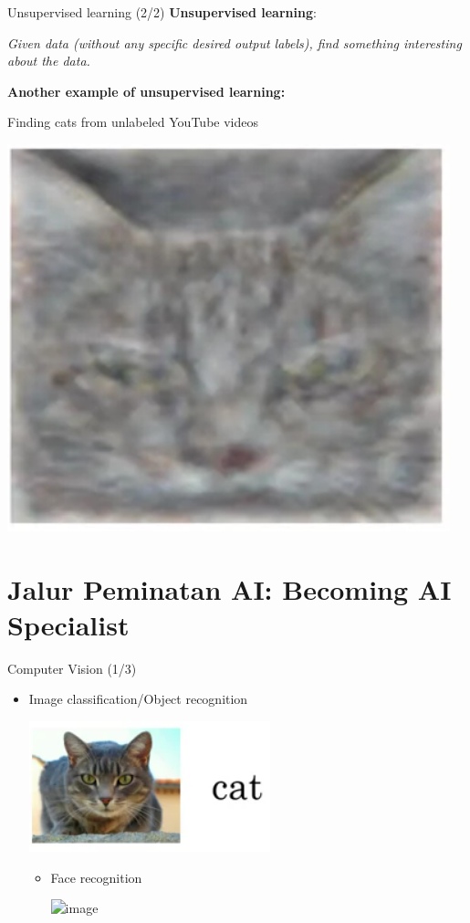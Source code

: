 \documentclass[pdf]{beamer}
\theoremstyle{mystyle}
\begin{document}
\begin{frame}{Unsupervised learning (2/2)}
	\textbf{Unsupervised learning}:
	\begin{center}
		\textit{Given data (without any specific desired output labels), find something interesting about the data.}
	\end{center}
	
	\textbf{Another example of unsupervised learning:}
	
	\bigskip	
	
	\pause Finding cats from unlabeled YouTube videos
	\begin{center}
		\includegraphics[scale=.25]{google-cats}
	\end{center}	
\end{frame}

\section{Jalur Peminatan AI: Becoming AI Specialist}
\begin{frame}{Computer Vision (1/3)}
	\begin{itemize}
		\item Image classification/Object recognition 
		\begin{center}
			\includegraphics[scale=.4]{image-classification}	
		\end{center}
		\begin{itemize}
			\item<2-> Face recognition
			\begin{center}
				\includegraphics<2->[scale=.35]{face-recognition}
			\end{center}
		\end{itemize}
	\end{itemize}
\end{frame}
\end{document}
